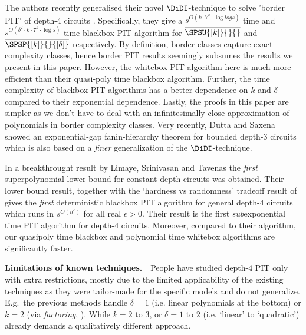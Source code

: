 The authors recently generalised their novel $\DiDI$-technique to solve 'border PIT' of depth-4 circuits \cite{DDS21}. Specifically, they give a $s^{O(k \cdot 7^k \cdot \log log s)}$ time and $s^{O(\delta^2 \cdot k \cdot 7^k \cdot \log s)}$ time blackbox PIT algorithm for $\overline{\SPSU{[k]}{}{}}$ and $\overline{\SPSP{[k]}{}{[\delta]}}$ respectively. By definition, border classes capture exact complexity classes, hence border PIT results seemingly subsumes the results we present in this paper. However, the whitebox PIT algorithm here is much more efficient than their quasi-poly time blackbox algorithm. Further, the time complexity of blackbox PIT algorithms has a better dependence on $k$ and $\delta$ compared to their exponential dependence. Lastly, the proofs in this paper are simpler as we don't have to deal with an infinitesimally close approximation of polynomials in  border complexity classes. Very recently, Dutta and Saxena~\cite{duttaseparated21} showed an exponential-gap fanin-hierarchy theorem for bounded depth-3 circuits which is also based on a {\em finer} generalization of the $\DiDI$-technique.

In a breakthrought result by Limaye, Srinivasan and Tavenas \cite{LST21} the {\em first} superpolynomial lower bound for constant depth circuits was obtained. Their lower bound result, together with the `hardness vs randomness' tradeoff result of \cite{chou2018hardness} gives the {\em first} deterministic blackbox PIT algorithm for general depth-4 circuits which runs in $s^{O(n^\epsilon)}$ for all real $\epsilon > 0$. Their result is the first {\em sub}exponential time PIT algorithm for depth-4 circuits. Moreover, compared to their algorithm, our quasipoly time blackbox and polynomial time whitebox algorithms are significantly faster.

%
\medskip
{\bf Limitations of known techniques.}~~People have studied depth-$4$ PIT only with extra restrictions, mostly due to the limited applicability of the existing techniques as they were tailor-made for the specific models and do not generalize. E.g.~the previous methods handle  $\delta=1$ (i.e. linear polynomials at the bottom) or $k=2$ (via \emph{factoring}, \cite{saha2013case}). While $k=2$ to $3$, or $\delta=1$ to $2$ (i.e. `linear' to `quadratic') already demands a qualitatively different approach.  

